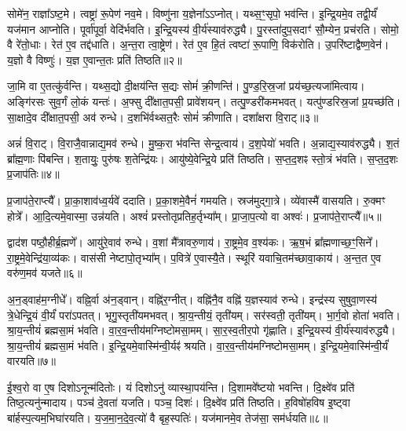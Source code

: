 सोमे॑न॒ राज्ञा᳚\-ऽष्ट॒मे।
त्वष्ट्रा॑ रू॒पेण॑ नव॒मे।
विष्णु॑ना य॒ज्ञेना᳚\-ऽ\-ऽ\-प्नोत्।
यथ्स॒ꣳ॒सृपो॒ भव॑न्ति।
इ॒न्द्रि॒यमे॒व तद्वी॒र्यं॑ यज॑मान आप्नोति।
पूर्वा॑पूर्वा॒ वेदि॑र्भवति।
इ॒न्द्रि॒यस्य॑ वी॒र्य॑स्याव॑रुद्ध्यै।
पु॒रस्ता॑\-दुप॒\-सदाꣳ॑ सौ॒म्येन॒ प्रच॑रति।
सोमो॒ वै रे॑तो॒धाः।
रेत॑ ए॒व तद्द॑धाति।
अ॒न्त॒रा त्वा॒ष्ट्रेण॑।
रेत॑ ए॒व हि॒तं त्वष्टा॑ रू॒पाणि॒ विक॑रोति।
उ॒परि॑ष्टाद्वैष्ण॒वेन॑।
य॒ज्ञो वै विष्णुः॑।
य॒ज्ञ ए॒वान्त॒तः प्रति॑ तिष्ठति॥२॥\anuvakamend[स॒प्त॒मे द॑धाति॒ पञ्च॑ च]

जा॒मि वा ए॒तत्कु॑र्वन्ति।
यथ्स॒द्यो दी॒क्षय॑न्ति स॒द्यः सोमं॑ क्री॒णन्ति॑।
पु॒ण्ड॒रि॒स्र॒जां प्रय॑च्छ॒त्यजा॑मित्वाय।
अङ्गि॑रसः सुव॒र्गं लो॒कं यन्तः॑।
अ॒फ्सु दी᳚क्षात॒पसी॒ प्रावे॑शयन्।
तत्पु॒ण्डरी॑कमभवत्।
यत्पु॑ण्डरिस्र॒जां प्र॒यच्छ॑ति।
सा॒क्षादे॒व दी᳚क्षात॒पसी॒ अव॑ रुन्धे।
द॒शभि॑र्वथ्सत॒रैः सोमं॑ क्रीणाति।
दशा᳚क्षरा वि॒राट्॥३॥

अन्नं॑ वि॒राट्।
वि॒राजै॒वान्नाद्य॒मव॑ रुन्धे।
मु॒ष्क॒रा भ॑वन्ति सेन्द्र॒त्वाय॑।
द॒श॒पेयो॑ भवति।
अ॒न्नाद्य॒स्याव॑रुद्ध्यै।
श॒तं ब्रा᳚ह्म॒णाः पि॑बन्ति।
श॒तायुः॒ पुरु॑षः श॒तेन्द्रि॑यः।
आयु॑ष्ये॒वेन्द्रि॒ये प्रति॑ तिष्ठति।
स॒प्त॒द॒शꣴ स्तो॒त्रं भ॑वति।
स॒प्त॒द॒शः प्र॒जा\-प॑तिः॥४॥

प्र॒जा\-प॑ते॒राप्त्यै᳚।
प्रा॒का॒शाव॑ध्व॒र्यवे॑ ददाति।
प्र॒का॒शमे॒वैनं॑ गमयति।
स्रज॑मुद्गा॒त्रे।
व्ये॑वास्मै॑ वासयति।
रु॒क्मꣳ होत्रे᳚।
आ॒दि॒त्यमे॒वास्मा॒ उन्न॑यति।
अश्वं॑ प्रस्तोतृप्रतिह॒र्तृभ्या᳚म्।
प्रा॒जा॒प॒त्यो वा अश्वः॑।
प्र॒जा\-प॑ते॒राप्त्यै᳚॥५॥

द्वाद॑श पष्ठौ॒हीर्ब्र॒ह्मणे᳚।
आयु॑रे॒वाव॑ रुन्धे।
व॒शां मै᳚त्रावरु॒णाय॑।
रा॒ष्ट्रमे॒व व॒श्य॑कः।
ऋ॒ष॒भं ब्रा᳚ह्मणाच्छ॒ꣳ॒सिने᳚।
रा॒ष्ट्रमे॒वेन्द्रि॑या॒\-व्य॑कः।
वास॑सी नेष्टापो॒तृभ्या᳚म्।
प॒वित्रे॑ ए॒वास्यै॒ते।
स्थूरि॑ यवाचि॒तम॑च्छावा॒काय॑।
अ॒न्त॒त ए॒व वरु॑ण॒मव॑ यजते॥६॥

अ॒न॒ड्वाह॑म॒ग्नीधे᳚।
वह्नि॒र्वा अ॑न॒ड्वान्।
वह्नि॑र॒ग्नीत्।
वह्नि॑नै॒व वह्नि॑ य॒ज्ञस्याव॑ रुन्धे।
इन्द्र॑स्य सुषुवा॒णस्य॑ त्रे॒धेन्द्रि॒यं वी॒र्यं॑ परा॑\-ऽपतत्।
भृगु॒स्तृती॑यमभवत्।
श्रा॒य॒न्तीयं॒ तृती॑यम्।
सर॑स्वती॒ तृती॑यम्।
भा॒र्ग॒वो होता॑ भवति।
श्रा॒य॒न्तीयं॑ ब्रह्मसा॒मं भ॑वति।
वा॒र॒व॒न्तीय॑\-मग्नि\-ष्टोम\-सा॒मम्।
सा॒र॒स्व॒तीर॒पो गृ॑ह्णाति।
इ॒न्द्रि॒यस्य॑ वी॒र्य॑स्याव॑रुद्ध्यै।
श्रा॒य॒न्तीयं॑ ब्रह्मसा॒मं भ॑वति।
इ॒न्द्रि॒यमे॒वास्मि॑न्वी॒र्यꣴ॑ श्रयति।
वा॒र॒व॒न्तीय॑मग्निष्टोमसा॒मम्।
इ॒न्द्रि॒यमे॒वास्मि॑न्वी॒र्यं॑ वारयति॥७॥\anuvakamend[वि॒राट्प्र॒जा\-प॑ति॒रश्वः॑ प्र॒जा\-प॑ते॒राप्त्यै॑ यजते ब्रह्मसा॒मं भ॑वति स॒प्त च॑]

ई॒श्व॒रो वा ए॒ष दिशो\-ऽनून्म॑दितोः।
यं दिशोऽनु॑ व्यास्था॒पय॑न्ति।
दि॒शामवे᳚ष्टयो भवन्ति।
दि॒क्ष्वे॑व प्रति॑ तिष्ठ॒त्यनु॑न्मादाय।
पञ्च॑ दे॒वता॑ यजति।
पञ्च॒ दिशः॑।
दि॒क्ष्वे॑व प्रति॑ तिष्ठति।
ह॒विषो॑हविष इ॒ष्ट्वा बा॑र्\mbox{}हस्प॒त्यम॒भिघा॑रयति।
य॒ज॒मा॒न॒दे॒व॒त्यो॑ वै बृह॒स्पतिः॑।
यज॑मानमे॒व तेज॑सा॒ सम॑र्धयति॥८॥

